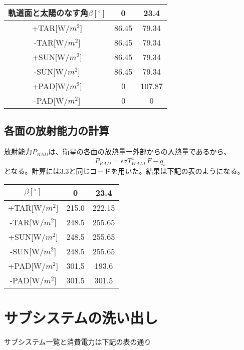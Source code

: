 \setlength{\tabcolsep}{.5zw}
\begin{tabularx}{40zw}{C|C C} \hline
  軌道面と太陽のなす角$\beta[^ \circ]$ & 0 & 23.4 \\ \hline
  +TAR[W/$m^2$] & 86.45 & 79.34 \\ \hline
  -TAR[W/$m^2$] & 86.45 & 79.34 \\ \hline
  +SUN[W/$m^2$] & 86.45 & 79.34 \\ \hline
  -SUN[W/$m^2$] & 86.45 & 79.34 \\ \hline
  +PAD[W/$m^2$] & 0 & 107.87 \\ \hline
  -PAD[W/$m^2$] & 0 & 0 \\ \hline
\end{tabularx}\par

\subsection{各面の放射能力の計算}
\setlength{\parskip}{0\baselineskip}
放射能力$P_{RAD}$は、衛星の各面の放熱量ー外部からの入熱量であるから、
\begin{equation}
  P_{RAD} = \epsilon \sigma T_{WALL}^4 F - q_s
\end{equation}
となる。計算には3.3と同じコードを用いた。結果は下記の表のようになる。\par
\setlength{\parskip}{1.0\baselineskip}

\setlength{\tabcolsep}{.5zw}
\begin{tabularx}{40zw}{C|C C} \hline
  $\beta[^ \circ]$ & 0 & 23.4 \\ \hline
  +TAR[W/$m^2$] & 215.0 & 222.15 \\ \hline
  -TAR[W/$m^2$] & 248.5 & 255.65 \\ \hline
  +SUN[W/$m^2$] & 248.5 & 255.65 \\ \hline
  -SUN[W/$m^2$] & 248.5 & 255.65\\ \hline
  +PAD[W/$m^2$] & 301.5 & 193.6 \\ \hline
  -PAD[W/$m^2$] & 301.5 & 301.5 \\ \hline
\end{tabularx}\par
\newpage

\section{サブシステムの洗い出し}
\setlength{\parskip}{0\baselineskip}
サブシステム一覧と消費電力は下記の表の通り\par
\setlength{\parskip}{1.0\baselineskip}

